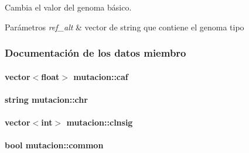 Cambia el valor del genoma básico. 


\begin{DoxyParams}{Parámetros}
{\em ref\-\_\-alt} & vector de string que contiene el genoma tipo \\
\hline
\end{DoxyParams}


\subsubsection{Documentación de los datos miembro}
\hypertarget{classmutacion_aeb2ac56009900d9319873d00ee80e090}{
\paragraph[{caf}]{\setlength{\rightskip}{0pt plus 5cm}vector$<$float$>$ mutacion\-::caf\hspace{0.3cm}{\ttfamily [private]}}}\label{classmutacion_aeb2ac56009900d9319873d00ee80e090}
\hypertarget{classmutacion_a57651966b952f782240ff9cff72c5d2f}{
\paragraph[{chr}]{\setlength{\rightskip}{0pt plus 5cm}string mutacion\-::chr\hspace{0.3cm}{\ttfamily [private]}}}\label{classmutacion_a57651966b952f782240ff9cff72c5d2f}
\hypertarget{classmutacion_adc0290c4a6db7f4c7341b0183c7ef534}{
\paragraph[{clnsig}]{\setlength{\rightskip}{0pt plus 5cm}vector$<$int$>$ mutacion\-::clnsig\hspace{0.3cm}{\ttfamily [private]}}}\label{classmutacion_adc0290c4a6db7f4c7341b0183c7ef534}
\hypertarget{classmutacion_a6dabfef6167d64030f095887b15f65dd}{
\paragraph[{common}]{\setlength{\rightskip}{0pt plus 5cm}bool mutacion\-::common\hspace{0.3cm}{\ttfamily [private]}}}\label{classmutacion_a6dabfef6167d64030f095887b15f65dd}
